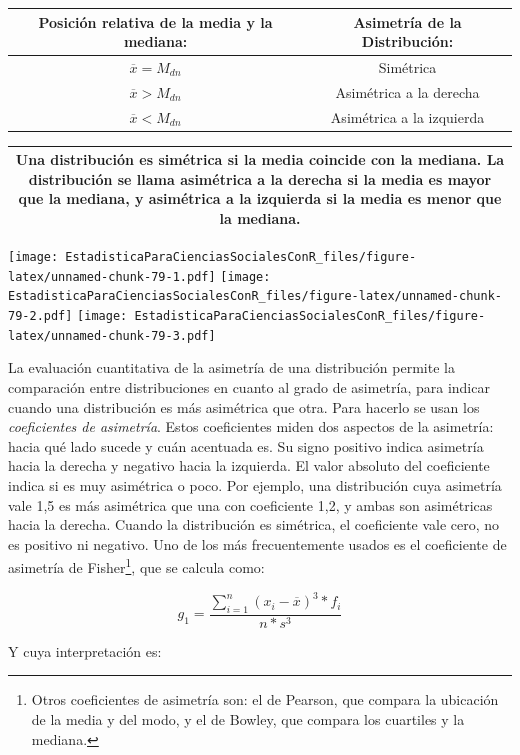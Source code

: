 \documentclass[]{book}
\let\rmarkdownfootnote\footnote%
\def\footnote{\protect\rmarkdownfootnote}
\begin{document}
\begin{longtable}[]{@{}cc@{}}
\toprule
Posición relativa de la media y la mediana: & Asimetría de la Distribución:\tabularnewline
\midrule
\endhead
\(\overline{x} = M_{dn}\) & Simétrica\tabularnewline
\(\overline{x} > M_{dn}\) & Asimétrica a la derecha\tabularnewline
\(\overline{x} < M_{dn}\) & Asimétrica a la izquierda\tabularnewline
\bottomrule
\end{longtable}

\begin{longtable}[]{@{}c@{}}
\toprule
\endhead
\begin{minipage}[t]{0.97\columnwidth}\centering
Una distribución es \textbf{simétrica} si la media coincide con la mediana. La distribución se llama asimétrica a la derecha si la media es mayor que la mediana, y asimétrica a la izquierda si la media es menor que la mediana.\strut
\end{minipage}\tabularnewline
\bottomrule
\end{longtable}

\texttt{[image: EstadisticaParaCienciasSocialesConR\_files/figure-latex/unnamed-chunk-79-1.pdf]} \texttt{[image: EstadisticaParaCienciasSocialesConR\_files/figure-latex/unnamed-chunk-79-2.pdf]} \texttt{[image: EstadisticaParaCienciasSocialesConR\_files/figure-latex/unnamed-chunk-79-3.pdf]}

La evaluación cuantitativa de la asimetría de una distribución permite la comparación entre distribuciones en cuanto al grado de asimetría, para indicar cuando una distribución es más asimétrica que otra. Para hacerlo se usan los \emph{coeficientes de asimetría}. Estos coeficientes miden dos aspectos
de la asimetría: hacia qué lado sucede y cuán acentuada es. Su signo
positivo indica asimetría hacia la derecha y negativo hacia la
izquierda. El valor absoluto del coeficiente indica si es muy asimétrica
o poco. Por ejemplo, una distribución cuya asimetría vale 1,5 es más
asimétrica que una con coeficiente 1,2, y ambas son asimétricas hacia la
derecha. Cuando la distribución es simétrica, el coeficiente vale cero,
no es positivo ni negativo. Uno de los más frecuentemente usados es el
coeficiente de asimetría de Fisher\footnote{Otros coeficientes de asimetría son: el de Pearson, que compara la ubicación de la media y del modo, y el de Bowley, que compara los cuartiles y la mediana.}, que se calcula como:

\[g_{1} = \frac{\sum_{i = 1}^{n}{\left( x_{i} - \overline{x} \right)^{3}*f_{i}}}{n*s^{3}}\]

Y cuya interpretación es:
\end{document}
